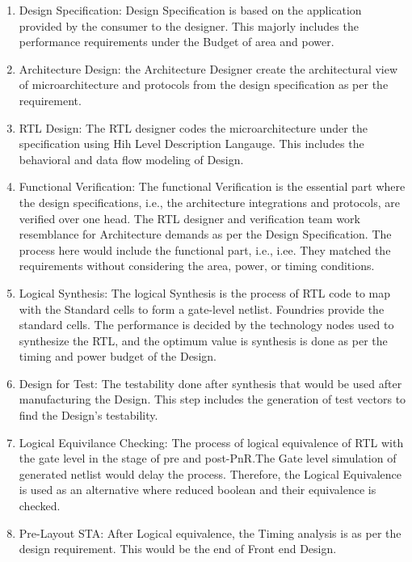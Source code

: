 \begin{enumerate}
    \item Design Specification: Design Specification is based on the application provided by the consumer to the designer. This majorly includes the performance requirements under the Budget of area and power.

    \item Architecture Design: the Architecture Designer create the architectural view of microarchitecture and protocols from the design specification as per the requirement.

    \item RTL Design: The RTL designer codes the microarchitecture under the specification using Hih Level Description Langauge. This includes the behavioral and data flow modeling of Design.

    \item Functional Verification: The functional Verification is the essential part where the design specifications, i.e., the architecture integrations and protocols, are verified over one head. The RTL designer and verification team work resemblance for Architecture demands as per the Design Specification. The process here would include the functional part, i.e., i.ee. They matched the requirements without considering the area, power, or timing conditions.

    \item Logical Synthesis: The logical Synthesis is the process of RTL code to map with the Standard cells to form a gate-level netlist. Foundries provide the standard cells. The performance is decided by the technology nodes used to synthesize the RTL, and the optimum value is synthesis is done as per the timing and power budget of the Design.

    \item Design for Test: The testability done after synthesis that would be used after manufacturing the Design. This step includes the generation of test vectors to find the Design's testability.

    \item Logical Equivilance Checking: The process of logical equivalence of RTL with the gate level in the stage of pre and post-PnR.The Gate level simulation of generated netlist would delay the process. Therefore, the Logical Equivalence is used as an alternative where reduced boolean and their equivalence is checked.

    \item Pre-Layout STA: After Logical equivalence, the Timing analysis is as per the design requirement. This would be the end of Front end Design.


\end{enumerate}
